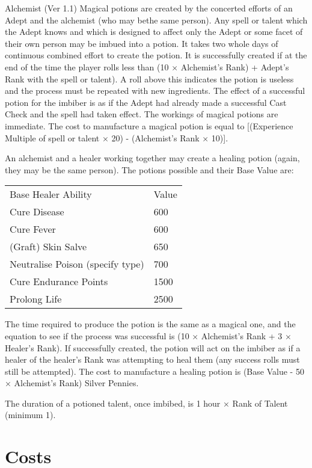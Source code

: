 \begin{Chapter}{Alchemist (Ver 1.1)}
Magical potions are created by the concerted efforts of an Adept and
the alchemist (who may bethe same person).  Any spell or talent which
the Adept knows and which is designed to affect only the Adept or some
facet of their own person may be imbued into a potion. It takes two
whole days of continuous combined effort to create the potion.  It is
successfully created if at the end of the time the player rolls less
than (10 × Alchemist’s Rank) + Adept’s Rank with the spell or
talent). A roll above this indicates the potion is useless and the
process must be repeated with new ingredients.  The effect of a
successful potion for the imbiber is as if the Adept had already made
a successful Cast Check and the spell had taken effect.  The workings
of magical potions are immediate.  The cost to manufacture a magical
potion is equal to [(Experience Multiple of spell or talent × 20) -
  (Alchemist’s Rank × 10)].

An alchemist and a healer working together may create a healing potion
(again, they may be the same person).  The potions possible and their
Base Value are:

\begin{tabularx}{\columnwidth}{Xl}
Base Healer Ability			& Value  \\
Cure Disease				& 600 \\
Cure Fever				& 600 \\
(Graft) Skin Salve			& 650 \\
Neutralise Poison (specify type)	& 700 \\
Cure Endurance Points			& 1500 \\ 
Prolong Life				& 2500 \\
\end{tabularx}

The time required to produce the potion is the same as a magical one,
and the equation to see if the process was successful is (10 ×
Alchemist’s Rank + 3 × Healer’s Rank).  If successfully created, the
potion will act on the imbiber as if a healer of the healer’s Rank was
attempting to heal them (any success rolls must still be attempted).
The cost to manufacture a healing potion is (Base Value - 50 ×
Alchemist’s Rank) Silver Pennies.

The duration of a potioned talent, once imbibed, is 1 hour × Rank of
Talent (minimum 1).

\section{Costs}


\end{Chapter}

